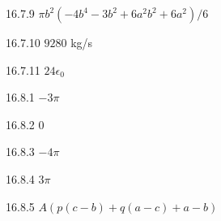 \begin{Answer}{16.7.9}
	$\pi b^2(-4b^4-3b^2+6a^2b^2+6a^2)/6$
\end{Answer}
\begin{Answer}{16.7.10}
	$9280$ kg/s
\end{Answer}
\begin{Answer}{16.7.11}
	$24\epsilon_0$
\end{Answer}
\begin{Answer}{16.8.1}
	$-3\pi$
\end{Answer}
\begin{Answer}{16.8.2}
	$0$
\end{Answer}
\begin{Answer}{16.8.3}
	$-4\pi$
\end{Answer}
\begin{Answer}{16.8.4}
	$3\pi$
\end{Answer}
\begin{Answer}{16.8.5}
	$A(p(c-b)+q(a-c)+a-b)$
\end{Answer}
